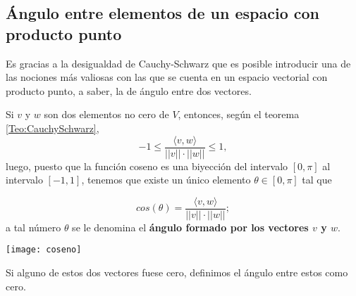 \begin{comment}
\item[$3) \Rightarrow  1)$] Supongamos, por el contrario, que
$span(B) \subsetneq V $; sea pues $v \in V - span(B)$.
\TODO{no sé si aquí hay un error en el argumento; ¿cómo
estoy segura de que tal proyección existe? recuerda que el teorema
de la proyección ortogonal habla en términos de subespacios
CERRADOS.}
Sea $v':= \Pi_{span(B)}(v)$; puesto que $v'$ es elemento de 
$span(B)$ y $v$ no, estos son vectores distintos entre sí, luego,
\[
\epsilon := ||v-v'|| >0.
\]
Ahora bien, para este $\epsilon$, 
como span(B) es denso en $V$, existe $v'' \in span(B)$ tal que
\[
|| v-v'' || < \frac{\epsilon}{2};
\]
esto contradice el que $v'$ sea el elemento de $span(B)$ más
cercano a $v$.

\item[ $3) \Rightarrow  2)$]
Si $W$ es un subespacio cerrado de $V$ que contiene a $B$,
entonces también contiene a su span, luego, contiene a su cerradura, o sea, 
\[
V= \overline{span}(B) \subseteq W,
\]
luego, $W=V$.

\item[ $2) \Rightarrow  3)$] Puesto que el que un conjunto esté
contenido en otro implica que la cerradura del primero esté contenida
en la cerradura del segundo, tenemos que
\[
V = \overline{B} \subseteq \overline{span}(B) 
\subseteq \overline{V} =V. 
\]
\end{itemize}
\QEDB
\end{dem}
\end{comment}

\subsection{Ángulo entre elementos de un espacio con producto punto}

Es gracias a la desigualdad de Cauchy-Schwarz
que es posible introducir una de las nociones
más valiosas con las que se cuenta en un espacio
vectorial con producto punto, a saber, la de ángulo entre dos
vectores.

Si $v$ y $w$ son dos elementos no cero de $V$, entonces,
según el teorema \ref{Teo:CauchySchwarz},
\[
-1 \leq \frac{\langle v, w \rangle}{||v|| \cdot ||w||} \leq 1,
\]
luego, puesto que la función coseno es una biyección
del intervalo $[0, \pi]$ al intervalo $[-1,1]$,
tenemos que existe un único elemento 
$\theta \in [0, \pi]$ tal que

\[
cos(\theta)= \frac{\langle v, w \rangle}{||v|| \cdot ||w||};
\]
a tal número $\theta$ se le denomina el 
\textbf{ángulo formado por los vectores $v$ y $w$}.

\begin{marginfigure}
\texttt{[image: coseno]}
\end{marginfigure}

Si alguno de estos dos vectores fuese cero, definimos
el ángulo entre estos como cero. 








